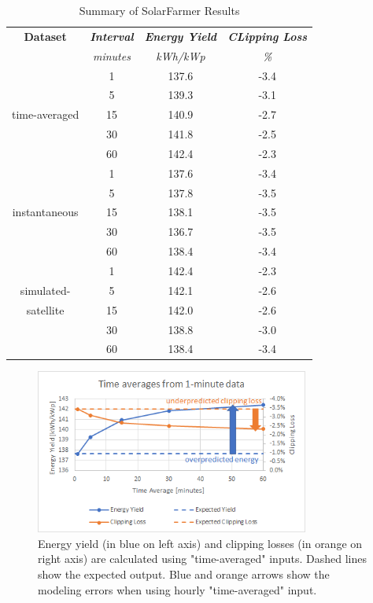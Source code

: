 \documentclass[conference]{IEEEtran}
\begin{document}
\begin{table}[htbp]
\caption{Summary of SolarFarmer Results}
\begin{center}
\begin{tabular}{|c|c|c|c|}
\hline
\textbf{Dataset} & \textbf{\textit{Interval}}& \textbf{\textit{Energy Yield}}& \textbf{\textit{CLipping Loss}} \\
                 & \textit{minutes}& \textit{kWh/kWp}& \textit{\%} \\
\hline
             &  1& 137.6& -3.4 \\
             &  5& 139.3& -3.1 \\
time-averaged& 15& 140.9& -2.7 \\
             & 30& 141.8& -2.5 \\
             & 60& 142.4& -2.3 \\

\hline
             &  1& 137.6& -3.4 \\
             &  5& 137.8& -3.5 \\
instantaneous& 15& 138.1& -3.5 \\
             & 30& 136.7& -3.5 \\
             & 60& 138.4& -3.4 \\
\hline
             &  1& 142.4& -2.3 \\
simulated-   &  5& 142.1& -2.6 \\
satellite    & 15& 142.0& -2.6 \\
             & 30& 138.8& -3.0 \\
             & 60& 138.4& -3.4 \\
\hline
\end{tabular}
\label{table:results-summary}
\end{center}
\end{table}

\begin{figure}[htbp]
\centerline{\includegraphics[width=9cm]{time-averaged.png}}
\caption{Energy yield (in blue on left axis) and clipping losses (in orange on right axis) are calculated using "time-averaged" inputs. Dashed lines show the expected output. Blue and orange arrows show the modeling errors when using hourly "time-averaged" input.}
\label{fig:time-averaged}
\end{figure}
\end{document}
